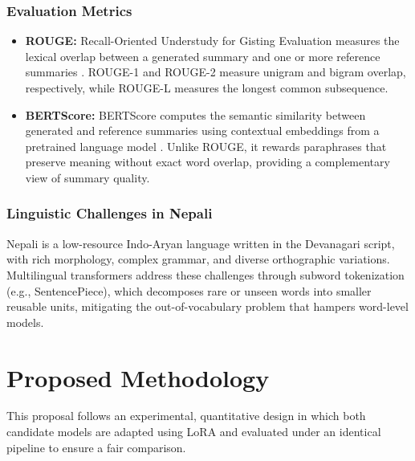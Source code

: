 \documentclass[12pt]{report}
\begin{document}
\subsection{Evaluation Metrics}
\begin{itemize}
    \item \textbf{ROUGE:} Recall-Oriented Understudy for Gisting Evaluation measures the lexical overlap between a generated summary and one or more reference summaries \cite{lin2004rouge}. ROUGE-1 and ROUGE-2 measure unigram and bigram overlap, respectively, while ROUGE-L measures the longest common subsequence.
    \item \textbf{BERTScore:} BERTScore computes the semantic similarity between generated and reference summaries using contextual embeddings from a pretrained language model \cite{zhang2020bertscore}. Unlike ROUGE, it rewards paraphrases that preserve meaning without exact word overlap, providing a complementary view of summary quality.
\end{itemize}

\subsection{Linguistic Challenges in Nepali}
Nepali is a low-resource Indo-Aryan language written in the Devanagari script, with rich morphology, complex grammar, and diverse orthographic variations. Multilingual transformers address these challenges through subword tokenization (e.g., SentencePiece), which decomposes rare or unseen words into smaller reusable units, mitigating the out-of-vocabulary problem that hampers word-level models.


\chapter{Proposed Methodology}
This proposal follows an experimental, quantitative design in which both candidate models are adapted using LoRA and evaluated under an identical pipeline to ensure a fair comparison.
\end{document}
